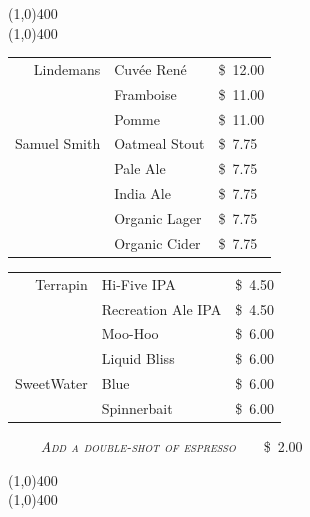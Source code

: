 \documentclass[letterpaper, 12pt]{article}%
\newcommand{\flowtherefore}{~~\raisebox{0.2ex}{$\therefore$}~~}
\newcommand{\price}[2]{
 \textsc{\small#1}\flowtherefore\$~\textsc{\small#2}
}
\newcommand{\varprice}[1]{
 \$~\textsc{\small#1}
}
\newcommand{\heading}[1]{{\large\bfseries #1\par}}
\newcommand{\flowentry}[1]{
{\calligra\centering\heading{\Huge #1}\vspace{-2ex}

\line(1,0){400}\vspace{-3ex}\\
\line(1,0){400}\vspace{-2ex}

}}
\begin{document}
\flowentry{Beer}

\newlength{\beerwi}
\newlength{\beerhi}
\setlength{\beerwi}{0.43\textwidth}
\setlength{\beerhi}{0.12\textwidth}

{\centering
\begin{minipage}[t][\beerhi][b]{\beerwi}
 \scshape
 \centering
 \begin{tabular}{@{} r l l @{}}
  Lindemans & Cuv\'{e}e Ren\'{e} & \varprice{12.00} \\
  & Framboise & \varprice{11.00} \\
  & Pomme & \varprice{11.00} \\
  Samuel Smith & Oatmeal Stout & \varprice{7.75} \\
  & Pale Ale & \varprice{7.75} \\
  & India Ale & \varprice{7.75} \\
  & Organic Lager & \varprice{7.75} \\
  & Organic Cider & \varprice{7.75} \\
 \end{tabular}
\end{minipage}
\begin{minipage}[t][\beerhi][b]{\beerwi}
 \scshape
 \centering
 \begin{tabular}{@{} r l l @{}}
  Terrapin & H\textnormal{i}-F\textnormal{i}ve IPA & \varprice{4.50} \\
  & Recreation Ale IPA & \varprice{4.50} \\
  & Moo-Hoo & \varprice{6.00} \\
  & Liquid Bliss & \varprice{6.00} \\
  SweetWater & Blue & \varprice{6.00} \\
  & Spinnerbait & \varprice{6.00} \\
 \end{tabular}
\end{minipage}

}

\vspace{1.0em}
{\centering
 \textbf{\textup{\normalsize{}}}\flowtherefore\price{\textrm{\emph{\normalsize Add a double-shot of espresso}}}{2.00}

}

\flowentry{}


\newlength{\ssminihi}
\newlength{\ssminiwi}
\newlength{\ocminiwi}
\setlength{\ssminihi}{0.14\textwidth}
\setlength{\ssminiwi}{0.55\textwidth}
\setlength{\ocminiwi}{0.15\textwidth}
\end{document}
